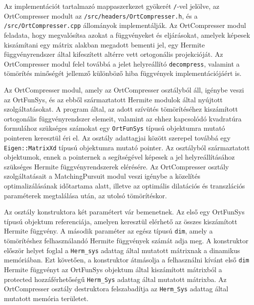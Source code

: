 \documentclass[oneside,titlepage,12pt,a4paper]{report}
\begin{document}
Az implementációt tartalmazó mappaszerkezet gyökerét \texttt{/}-vel jelölve, az OrtCompresser modult  az \texttt{/src/headers/OrtCompresser.h}, és a \texttt{/src/OrtCompresser.cpp} állományok implementálják.
Az OrtCompresser modul feladata, hogy megvalósítsa azokat a függvényeket és eljárásokat, amelyek képesek kiszámítani egy mátrix alakban megadott bementi jel, egy Hermite függvényrendszer által kifeszített altérre vett ortogonális projekcióját. Az OrtCompresser modul felel továbbá a jelet helyreállító  \texttt{decompress}, valamint a tömörítés minőségét jellemző különböző hiba függvények implementációjáért is.
\par Az OrtCompresser modul, amely az OrtCompresser osztályból áll, igénybe veszi az OrtFunSys, és az ebből származtatott Hermite modulok által nyújtott szolgáltatásokat. A program által, az adott szívütés tömörítéséhez kiszámított ortogonális függvényrendszer elemeit, valamint az ehhez kapcsolódó kvadratúra formulához szükséges számokat egy \texttt{OrtFunSys} típusú objektumra mutató pointeren keresztül éri el. Az osztály adattagjai között szerepel továbbá egy \texttt{Eigen::MatrixXd} típusú objektumra mutató pointer. Az osztályból származtatott objektumok, ennek a pointernek a segítségével képesek a jel helyreállításához szükséges Hermite függvényrendszerek elérésére. Az OrtCompresser osztály szolgáltatásait a MatchingPursuit modul veszi igénybe a közelítés optimalizálásának időtartama alatt, illetve az optimális dilatációs és transzlációs paraméterek megtalálása után, az utolsó tömörítéskor.  
\par Az osztály konstruktora két paramétert vár bemenetnek. Az első egy OrtFunSys típusú objektum referenciája, amelyen keresztül elérhető az összes kiszámított Hermite függvény. A második paraméter az egész típusú \texttt{dim}, amely a tömörítéshez felhasználandó Hermite függvények számát adja meg. A konstruktor először helyet foglal a \texttt{Herm\_sys} adattag által mutatott mátrixnak a dinamikus memóriában. Ezt követően, a konstruktor átmásolja a felhasználni kívánt első \texttt{dim} Hermite függvényt az OrtFunSys objektum által kiszámított mátrixból a protected hozzáférhetőségű \texttt{Herm\_Sys} adattag által mutatott mátrixba. Az OrtCompresser osztály destruktora felszabadítja az \texttt{Herm\_Sys} adattag által mutatott memória területet. 
\end{document}
